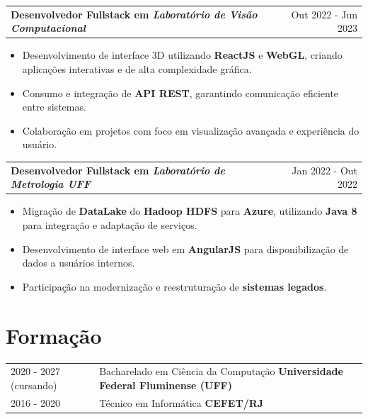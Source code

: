 \documentclass[a4paper,10.5pt]{article}
\makeatletter
\newenvironment{joblong}[2]
    {
    \begin{tabularx}{\linewidth}{@{}l X r@{}}
    \textbf{#1} & \hfill &  #2 \\[3.75pt]
    \end{tabularx}
    \begin{minipage}[t]{\linewidth}
    \begin{itemize}[nosep,after=\strut, leftmargin=1em, itemsep=3pt,label=--]
    }
    {
    \end{itemize}
    \end{minipage}    
    }
\makeatother
\begin{document}
\begin{joblong}{Desenvolvedor Fullstack em \textit{Laboratório de Visão Computacional}}{Out 2022 - Jun 2023}
    \item Desenvolvimento de interface 3D utilizando \textbf{ReactJS} e \textbf{WebGL}, criando aplicações interativas e de alta complexidade gráfica.
    \item Consumo e integração de \textbf{API REST}, garantindo comunicação eficiente entre sistemas.
    \item Colaboração em projetos com foco em visualização avançada e experiência do usuário.
\end{joblong}

\begin{joblong}{Desenvolvedor Fullstack em \textit{Laboratório de Metrologia UFF}}{Jan 2022 - Out 2022}
    \item Migração de \textbf{DataLake} do \textbf{Hadoop HDFS} para \textbf{Azure}, utilizando \textbf{Java 8} para integração e adaptação de serviços.
    \item Desenvolvimento de interface web em \textbf{AngularJS} para disponibilização de dados a usuários internos.
    \item Participação na modernização e reestruturação de \textbf{sistemas legados}.
\end{joblong}
  


\section{Formação}
\begin{tabularx}{\linewidth}{@{}l X@{}}	

2020 - 2027 (cursando) & Bacharelado em Ciência da Computação \textbf{ Universidade Federal Fluminense (UFF)}\\

2016 - 2020 & Técnico em Informática \textbf{ CEFET/RJ }\\

\end{tabularx}
\end{document}
